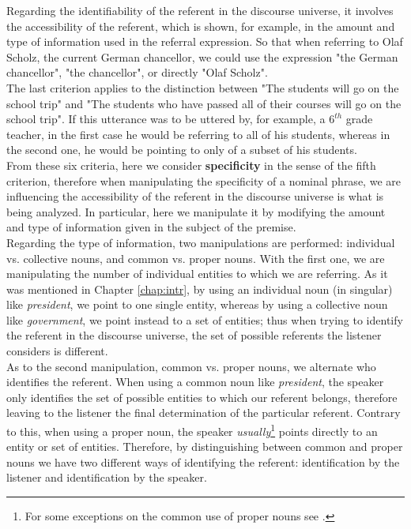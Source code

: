 Regarding the identifiability of the referent in the discourse universe, it involves the accessibility of the referent, which is shown, for example, in the amount and type of information used in the referral expression. So that when referring to Olaf Scholz, the current German chancellor, we could use the expression "the German chancellor", "the chancellor", or directly "Olaf Scholz".\\  
The last criterion applies to the distinction between "The students will go on the school trip" and "The students who have passed all of their courses will go on the school trip". If this utterance was to be uttered by, for example, a $6^{th}$ grade teacher, in the first case he would be referring to all of his students, whereas in the second one, he would be pointing to only of a subset of his students.\\ 

From these six criteria, here we consider \textbf{specificity} in the sense of the fifth criterion, therefore when manipulating the specificity of a nominal phrase, we are influencing the accessibility of the referent in the discourse universe is what is being analyzed. In particular, here we manipulate it by modifying the amount and type of information given in the subject of the premise.\\ 

Regarding the type of information, two manipulations are performed: individual vs. collective nouns, and common vs. proper nouns. With the first one, we are manipulating the number of individual entities to which we are referring. As it was mentioned in Chapter \ref{chap:intr}, by using an individual noun (in singular) like \textit{president}, we point to one single entity, whereas by using a collective noun like \textit{government}, we point instead to a set of entities; thus when trying to identify the referent in the discourse universe, the set of possible referents the listener considers is different.\\

As to the second manipulation, common vs. proper nouns, we alternate who identifies the referent. When using a common noun like \textit{president}, the speaker only identifies the set of possible entities to which our referent belongs, therefore leaving to the listener the final determination of the particular referent. Contrary to this, when using a proper noun, the speaker \textit{usually}\footnote{For some exceptions on the common use of proper nouns see \citet{caudet1999expresiones}.} points directly to an entity or set of entities. Therefore, by distinguishing between common and proper nouns we have two different ways of identifying the referent: identification by the listener and identification by the speaker.\\

